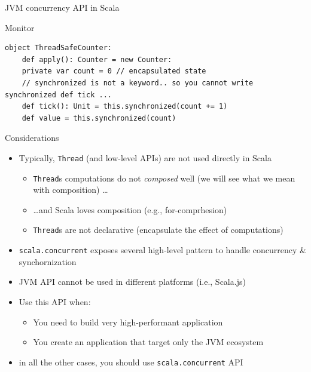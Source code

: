 \documentclass[presentation, 9pt]{beamer}\mode<presentation>{\usetheme{AMSBolognaFC}}
\begin{document}
\begin{frame}{JVM concurrency API in Scala}
\begin{itemize}
\begin{alertblock}{Monitor}
\begin{itemize}
\begin{tcolorbox}[left=0pt, top=0pt, bottom=0pt]
\begin{verbatim}
object ThreadSafeCounter:
	def apply(): Counter = new Counter:
    private var count = 0 // encapsulated state
    // synchronized is not a keyword.. so you cannot write synchronized def tick ...
    def tick(): Unit = this.synchronized(count += 1)
    def value = this.synchronized(count)
					\end{verbatim}
				\end{tcolorbox}
			\end{itemize}
		\end{alertblock}
	\end{itemize}
\end{frame}
\begin{frame}{Considerations}
	\begin{itemize}
		\item Typically, \texttt{Thread} (and low-level APIs) are not used directly in Scala
  	\begin{itemize}
			\item \texttt{Thread}s computations do not \emph{composed} well (we will see what we mean with composition) \dots
   		\item \dots and Scala loves composition (e.g., for-comprhesion)
     \item \texttt{Thread}s are not declarative (encapsulate the effect of computations)
		\end{itemize}
 		\item \texttt{scala.concurrent} exposes several high-level pattern to handle concurrency \& synchornization
 		\item JVM API cannot be used in different platforms (i.e., Scala.js)
   	\item Use this API when:
    \begin{itemize}
			\item You need to build very high-performant application
   		\item You create an application that target only the JVM ecosystem 
		\end{itemize}
		\item in all the other cases, you should use \texttt{scala.concurrent} API
  \end{itemize}
\end{frame}
\end{document}
